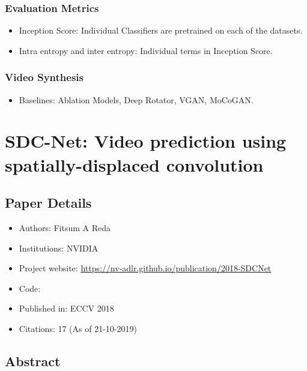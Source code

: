 \documentclass{article}
\begin{document}
    \subsubsection{Evaluation Metrics}\label{subsubsec:Probabilistic_Video_Generation_using_Holistic_Attribute_Control_(VideoVAE):evaluation-metrics}
    \begin{itemize}
        \item Inception Score: Individual Classifiers are pretrained on each of the datasets.
        \item Intra entropy and inter entropy: Individual terms in Inception Score.
    \end{itemize}

    \subsubsection{Video Synthesis}\label{subsubsec:Probabilistic_Video_Generation_using_Holistic_Attribute_Control_(VideoVAE):video-synthesis}
    \begin{itemize}
        \item Baselines: Ablation Models, Deep Rotator, VGAN, MoCoGAN\@.
    \end{itemize}
    \newpage


    \section{SDC-Net: Video prediction using spatially-displaced convolution}\label{sec:SDC_Net_Video_prediction_using_spatially_displaced_convolution}
    \subsection*{Paper Details}
    \begin{itemize}
        \item Authors: Fitsum A Reda
        \item Institutions: NVIDIA
        \item Project website: \url{https://nv-adlr.github.io/publication/2018-SDCNet}
        \item Code:
        \item Published in: ECCV 2018
        \item Citations: 17 (As of 21-10-2019)
    \end{itemize}

    \subsection*{Abstract}
\end{document}
